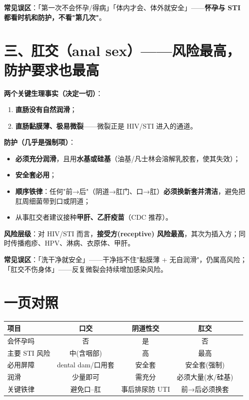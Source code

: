 \textbf{常见误区}：「第一次不会怀孕/得病」「体内才会、体外就安全」——\textbf{怀孕与 STI 都看时机和防护，不看"第几次"}。

\section{三、肛交（anal sex）——风险最高，防护要求也最高}

\textbf{两个关键生理事实（决定一切）}：
\begin{enumerate}[leftmargin=2em,itemsep=0.3em]
  \item \textbf{直肠没有自然润滑}；
  \item \textbf{直肠黏膜薄、极易微裂}——微裂正是 HIV/STI 进入的通道。
\end{enumerate}

\textbf{防护（几乎是强制项）}：
\begin{itemize}[leftmargin=2em,itemsep=0.3em]
  \item \textbf{必须充分润滑}，且用\textbf{水基或硅基}（油基/凡士林会溶解乳胶套，使其失效）；
  \item \textbf{安全套必用}；
  \item \textbf{顺序铁律}：任何"前→后"（阴道→肛门、口→肛）\textbf{必须换新套并清洁}，避免把肛周细菌带到口或阴道；
  \item 从事肛交者建议接种\textbf{甲肝、乙肝疫苗}（CDC 推荐）。
\end{itemize}

\textbf{风险层级}：对 HIV/STI 而言，\textbf{接受方(receptive) 风险最高}，其次为插入方；同时传播疱疹、HPV、淋病、衣原体、甲肝。

\textbf{常见误区}：「洗干净就安全」——干净挡不住"黏膜薄 + 无自润滑"，仍属高风险；「肛交不伤身体」——反复微裂会持续增加感染风险。

\section{一页对照}

\begin{tabularx}{\textwidth}{lCCCC}
\toprule
项目 & 口交 & 阴道性交 & 肛交 \\
\midrule
会怀孕吗 & 否 & 是 & 否 \\
主要 STI 风险 & 中(含咽部) & 高 & 最高 \\
必用屏障 & dental dam/口用套 & 安全套 & 安全套(强制) \\
润滑 & 少量即可 & 需充分 & 必须大量(水/硅基) \\
关键铁律 & 避免口--肛 & 事后排尿防 UTI & 前→后必须换套 \\
\bottomrule
\end{tabularx}

